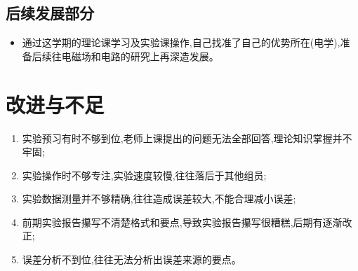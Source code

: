 \documentclass[12pt, a4paper]{article}
\begin{document}
\subsection*{后续发展部分}
\begin{itemize}
    \item 通过这学期的理论课学习及实验课操作,自己找准了自己的优势所在(电学),准备后续往电磁场和电路的研究上再深造发展。
\end{itemize}

\section*{改进与不足}
\begin{enumerate}
    \item 实验预习有时不够到位,老师上课提出的问题无法全部回答,理论知识掌握并不牢固;
    \item 实验操作时不够专注,实验速度较慢,往往落后于其他组员;
    \item 实验数据测量并不够精确,往往造成误差较大,不能合理减小误差;
    \item 前期实验报告攥写不清楚格式和要点,导致实验报告攥写很糟糕,后期有逐渐改正;
    \item 误差分析不到位,往往无法分析出误差来源的要点。
\end{enumerate}
\end{document}
